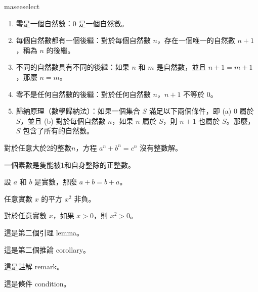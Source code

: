 \documentclass[writingLanguage=chinese,
    addPageTitle=on,
    addDeclaration=on,
    addMUSTlog=off,
    addFigTOC=on,   
    addTabTOC=on,
    refIndent=on,
    printMod=off,
]{.def/must}
\begin{document}
\begin{axiom}[皮亞諾公理 1]
maseeselect
\begin{enumerate}[label=\Alph*.]
\item 零是一個自然數：$0$ 是一個自然數。
\item 每個自然數都有一個後繼：對於每個自然數 $n$，存在一個唯一的自然數 $n+1$，稱為 $n$ 的後繼。
\item 不同的自然數具有不同的後繼：如果 $n$ 和 $m$ 是自然數，並且 $n+1 = m+1$，那麼 $n = m$。
\item 零不是任何自然數的後繼：對於任何自然數 $n$，$n+1$ 不等於 $0$。
\item 歸納原理（數學歸納法）：如果一個集合 $S$ 滿足以下兩個條件，即 (a) $0$ 屬於 $S$，並且 (b) 對於每個自然數 $n$，如果 $n$ 屬於 $S$，則 $n+1$ 也屬於 $S$。那麼，$S$ 包含了所有的自然數。
\end{enumerate}
\end{axiom}

\begin{theorem}[費馬定理]
對於任意大於2的整數$n$，方程 $a^n + b^n = c^n$ 沒有整數解。
\end{theorem}



\begin{definition}
    一個素數是隻能被1和自身整除的正整數。
\end{definition}
\begin{example}
    設 $a$ 和 $b$ 是實數，那麼 $a+b=b+a$。
\end{example}

\begin{property}
    任意實數 $x$ 的平方 $x^2$ 非負。
\end{property}
\begin{proposition}
    對於任意實數 $x$，如果 $x > 0$，則 $x^2 > 0$。
\end{proposition}
\begin{lemma}
這是第二個引理 lemma。
\end{lemma}

\begin{corollary}
這是第二個推論 corollary。
\end{corollary}

\begin{remark}
這是註解 remark。
\end{remark}



\begin{condition}
這是條件 condition。
\end{condition}
\end{document}
